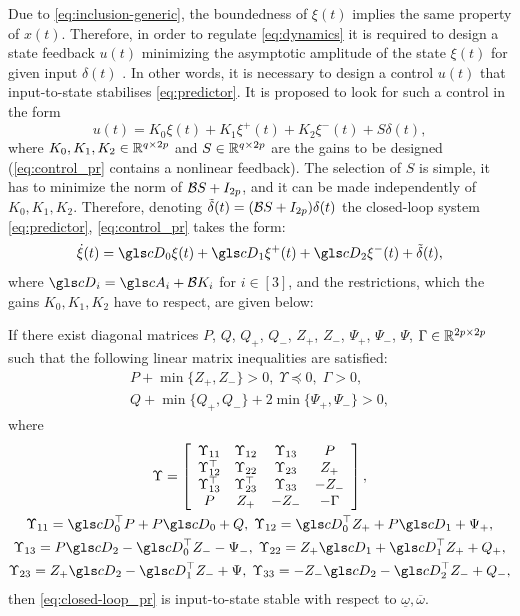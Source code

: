 Due to \eqref{eq:inclusion-generic}, the boundedness of $\xi(t)$
implies the same property of $x(t)$. Therefore, in order to regulate
\eqref{eq:dynamics} it is required to design a state feedback $u(t)$
minimizing the asymptotic amplitude of the state $\xi(t)$ for given
input $\delta(t)$ \citep{Efimov2013a}. In other words, it is necessary
to design a control $u(t)$ that input-to-state stabilises \eqref{eq:predictor}.
It is proposed to look for such a control in the form
\begin{equation}
u(t)=K_{0}\xi(t)+K_{1}\xi^{+}(t)+K_{2}\xi^{-}(t)+S\delta(t),\label{eq:control_pr}
\end{equation}
where $K_{0},K_{1},K_{2}\in\mathbb{R}^{q\times2p}$ and $S\in\mathbb{R}^{q\times2p}$
are the gains to be designed (\eqref{eq:control_pr} contains a nonlinear
feedback). The selection of $S$ is simple, it has to minimize the
norm of $\mathcal{B} S+I_{2p}$, and it can be made independently of $K_{0},K_{1},K_{2}$.
Therefore, denoting $\tilde{\delta}(t)=(\mathcal{B} S+I_{2p})\delta(t)$ the
closed-loop system \eqref{eq:predictor}, \eqref{eq:control_pr} takes
the form:
\begin{equation}
\dot{\xi}(t)=\cD_{0}\xi(t)+\cD_{1}\xi^{+}(t)+\cD_{2}\xi^{-}(t)+\tilde{\delta}(t),\label{eq:closed-loop_pr}
\end{equation}
where $\cD_{i}=\cA_{i}+\cB K_{i}$ for $i\in[3]$, and the restrictions,
which the gains $K_{0},K_{1},K_{2}$ have to respect, are given below:
\begin{theorem}
	\begin{leftbar}[theorembar]
	\label{thm:ISS_pr} If there exist diagonal matrices $P$, $Q$, $Q_{+}$,
	$Q_{-}$, $Z_{+}$, $Z_{-}$, $\Psi_{+}$, $\Psi_{-}$, $\Psi$, $\Gamma\in\mathbb{R}^{2p\times2p}$
	such that the following linear matrix inequalities are satisfied:
	\begin{gather*}
	P+\min\{Z_{+},Z_{-}\}>0,\;\Upsilon\preceq0,\;\Gamma>0,\\
	Q+\min\{Q_{+},Q_{-}\}+2\min\{\Psi_{+},\Psi_{-}\}>0,
	\end{gather*}
	where
	\begin{gather*}
	\Upsilon=\left[\begin{array}{cccc}
	\Upsilon_{11} & \Upsilon_{12} & \Upsilon_{13} & P\\
	\Upsilon_{12}^{\top} & \Upsilon_{22} & \Upsilon_{23} & Z_{+}\\
	\Upsilon_{13}^{\top} & \Upsilon_{23}^{\top} & \Upsilon_{33} & -Z_{-}\\
	P & Z_{+} & -Z_{-} & -\Gamma
	\end{array}\right],\\
	\Upsilon_{11}=\cD_{0}^{\top}P+P\cD_{0}+Q,\;\Upsilon_{12}=\cD_{0}^{\top}Z_{+}+P\cD_{1}+\Psi_{+},\\
	\Upsilon_{13}=P\cD_{2}-\cD_{0}^{\top}Z_{-}-\Psi_{-},\;\Upsilon_{22}=Z_{+}\cD_{1}+\cD_{1}^{\top}Z_{+}+Q_{+},\\
	\Upsilon_{23}=Z_{+}\cD_{2}-\cD_{1}^{\top}Z_{-}+\Psi,\;\Upsilon_{33}=-Z_{-}\cD_{2}-\cD_{2}^{\top}Z_{-}+Q_{-},
	\end{gather*}
	then \eqref{eq:closed-loop_pr} is input-to-state stable with respect
	to $\underline{\omega},\overline{\omega}$.
	\end{leftbar}
\end{theorem}
